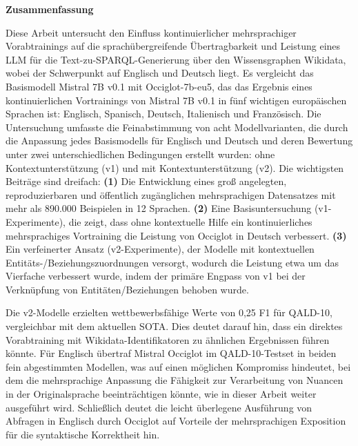 \documentclass[
	a4paper,
	pagesize,
	pdftex,
	12pt,
	ngerman,
	fleqn,
	final,
	]{scrartcl}
\begin{document}
\thispagestyle{empty}
\begin{center}
    \vspace*{2cm}
    \Large\textbf{Zusammenfassung}
    \vspace{1.5cm}
\end{center}
Diese Arbeit untersucht den Einfluss kontinuierlicher mehrsprachiger Vorabtrainings auf die sprachübergreifende Übertragbarkeit und Leistung eines LLM für die Text-zu-SPARQL-Generierung über den Wissensgraphen Wikidata, wobei der Schwerpunkt auf Englisch und Deutsch liegt. 
Es vergleicht das Basismodell Mistral 7B v0.1 mit Occiglot-7b-eu5, das das Ergebnis eines kontinuierlichen Vortrainings von Mistral 7B v0.1 in fünf wichtigen europäischen Sprachen ist: Englisch, Spanisch, Deutsch, Italienisch und Französisch.
Die Untersuchung umfasste die Feinabstimmung von acht Modellvarianten, die durch die Anpassung jedes Basismodells für Englisch und Deutsch und deren Bewertung unter zwei unterschiedlichen Bedingungen erstellt wurden: ohne Kontextunterstützung (v1) und mit Kontextunterstützung (v2).
Die wichtigsten Beiträge sind dreifach: \textbf{(1)} Die Entwicklung eines groß angelegten, reproduzierbaren und öffentlich zugänglichen mehrsprachigen Datensatzes mit mehr als 890.000 Beispielen in 12 Sprachen. \textbf{(2)} Eine Basisuntersuchung (v1-Experimente), die zeigt, dass ohne kontextuelle Hilfe ein kontinuierliches mehrsprachiges Vortraining die Leistung von Occiglot in Deutsch verbessert. \textbf{(3)} Ein verfeinerter Ansatz (v2-Experimente), der Modelle mit kontextuellen Entitäts-/Beziehungszuordnungen versorgt, wodurch die Leistung etwa um das Vierfache verbessert wurde, indem der primäre Engpass von v1 bei der Verknüpfung von Entitäten/Beziehungen behoben wurde.

Die v2-Modelle erzielten wettbewerbsfähige Werte von 0,25 F1 für QALD-10, vergleichbar mit dem aktuellen SOTA. Dies deutet darauf hin, dass ein direktes Vorabtraining mit Wikidata-Identifikatoren zu ähnlichen Ergebnissen führen könnte. 
Für Englisch übertraf Mistral Occiglot im QALD-10-Testset in beiden fein abgestimmten Modellen, was auf einen möglichen Kompromiss hindeutet, bei dem die mehrsprachige Anpassung die Fähigkeit zur Verarbeitung von Nuancen in der Originalsprache beeinträchtigen könnte, wie in dieser Arbeit weiter ausgeführt wird.
Schließlich deutet die leicht überlegene Ausführung von Abfragen in Englisch durch Occiglot auf Vorteile der mehrsprachigen Exposition für die syntaktische Korrektheit hin.


\end{document}
